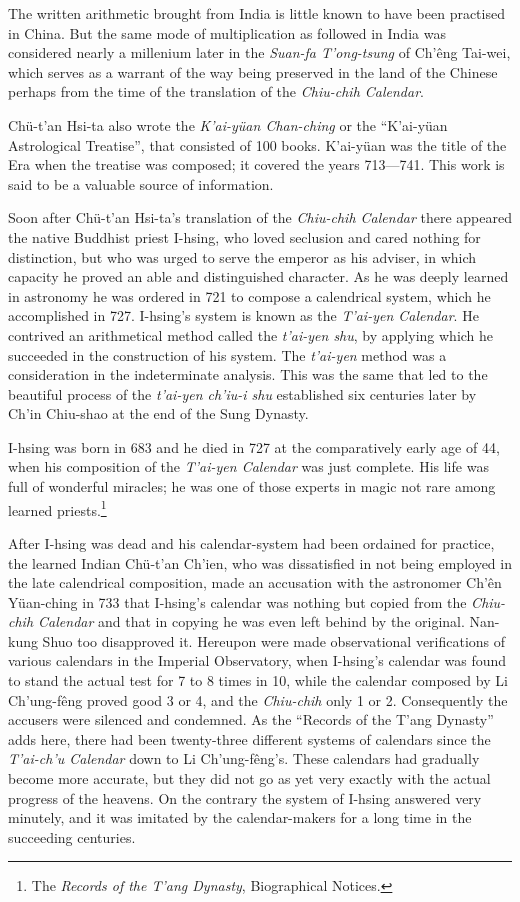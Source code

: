 \documentclass[11pt]{article}
\newcommand{\scanpage}[2]{\clearpage\setcounter{footnote}{0}\noindent{\footnotesize\color{gray}PDF page #1 · #2}\par\medskip}
\newcommand{\scanfooter}{}
\begin{document}
The written arithmetic brought from India is little known to have been practised in China. But the same mode of multiplication as followed in India was considered nearly a millenium later in the \emph{Suan-fa T'ong-tsung} of Ch'êng Tai-wei, which serves as a warrant of the way being preserved in the land of the Chinese perhaps from the time of the translation of the \emph{Chiu-chih Calendar}.

Chü-t'an Hsi-ta also wrote the \emph{K'ai-yüan Chan-ching} or the ``K'ai-yüan Astrological Treatise'', that consisted of 100 books. K'ai-yüan was the title of the Era when the treatise was composed; it covered the years 713---741. This work is said to be a valuable source of information.
\scanfooter

\scanpage{0074}{Chapter 9, printed page 60}
\setcounter{footnote}{0}
Soon after Chü-t'an Hsi-ta's translation of the \emph{Chiu-chih Calendar} there appeared the native Buddhist priest I-hsing, who loved seclusion and cared nothing for distinction, but who was urged to serve the emperor as his adviser, in which capacity he proved an able and distinguished character. As he was deeply learned in astronomy he was ordered in 721 to compose a calendrical system, which he accomplished in 727. I-hsing's system is known as the \emph{T'ai-yen Calendar}. He contrived an arithmetical method called the \emph{t'ai-yen shu}, by applying which he succeeded in the construction of his system. The \emph{t'ai-yen} method was a consideration in the indeterminate analysis. This was the same that led to the beautiful process of the \emph{t'ai-yen ch'iu-i shu} established six centuries later by Ch'in Chiu-shao at the end of the Sung Dynasty.

I-hsing was born in 683 and he died in 727 at the comparatively early age of 44, when his composition of the \emph{T'ai-yen Calendar} was just complete. His life was full of wonderful miracles; he was one of those experts in magic not rare among learned priests.\footnote{The \emph{Records of the T'ang Dynasty}, Biographical Notices.}

After I-hsing was dead and his calendar-system had been ordained for practice, the learned Indian Chü-t'an Ch'ien, who was dissatisfied in not being employed in the late calendrical composition, made an accusation with the astronomer Ch'ên Yüan-ching in 733 that I-hsing's calendar was nothing but copied from the \emph{Chiu-chih Calendar} and that in copying he was even left behind by the original. Nan-kung Shuo too disapproved it. Hereupon were made observational verifications of various calendars in the Imperial Observatory, when I-hsing's calendar was found to stand the actual test for 7 to 8 times in 10, while the calendar composed by Li Ch'ung-fêng proved good 3 or 4, and the \emph{Chiu-chih} only 1 or 2. Consequently the accusers were silenced and condemned. As the ``Records of the T'ang Dynasty'' adds here, there had been twenty-three different systems of calendars since the \emph{T'ai-ch'u Calendar} down to Li Ch'ung-fêng's. These calendars had gradually become more accurate, but they did not go as yet very exactly with the actual progress of the heavens. On the contrary the system of I-hsing answered very minutely, and it was imitated by the calendar-makers for a long time in the succeeding centuries.
\end{document}
